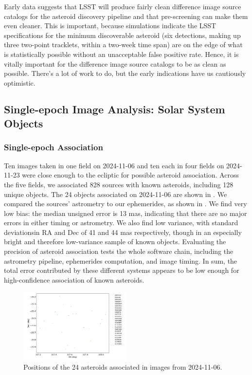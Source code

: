 Early data suggests that LSST will produce fairly clean difference image source catalogs for the asteroid discovery pipeline and that pre-screening can make them even cleaner. This is important, because simulations indicate the LSST specifications for the minimum discoverable asteroid (six detections, making up three two-point tracklets, within a two-week time span) are on the edge of what is statistically possible without an unacceptable false positive rate. Hence, it is vitally important for the difference image source catalogs to be as clean as possible. There's a lot of work to do, but the early indications have us cautiously optimistic.

\subsection{Single-epoch Image Analysis: Solar System Objects}
\label{sec:sia_solar_system}

\subsubsection{Single-epoch Association}
\label{sec:association}


Ten images taken in one field on 2024-11-06 and ten each in four fields on 2024-11-23 were close enough to the ecliptic for possible asteroid association. Across the five fields, we associated 828 sources with known asteroids, including 128 unique objects. The 24 objects associated on 2024-11-06 are shown in . We compared the sources' astrometry to our ephemerides, as shown in . We find very low bias: the median unsigned error is 13 mas, indicating that there are no major errors in either timing or astrometry. We also find low variance, with standard deviationsin RA and Dec of 41 and 44 mas respectively, though in an especially bright and therefore low-variance sample of known objects. Evaluating the precision of asteroid association tests the whole software chain, including the astrometry pipeline, ephemerides computation, and image timing. In sum, the total error contributed by these different systems appears to be low enough for high-confidence association of known asteroids.

\begin{figure}
  \includegraphics[width=0.5\textwidth]{sso_figures/24_asteroids.pdf}
  \caption{Positions of the 24 asteroids associated in images from 2024-11-06.}
  \label{fig:solar_system_positions}
\end{figure}

